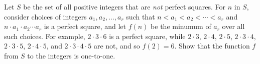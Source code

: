 Let $S$ be the set of all positive integers that are \emph{not} perfect squares. For $n$ in $S$, consider choices of integers
$a_1, a_2, \dots, a_r$ such that $n < a_1<  a_2 < \cdots < a_r$
and $n \cdot a_1 \cdot a_2 \cdots a_r$ is a perfect square, and
let $f(n)$ be the minumum of $a_r$ over all such choices. For example,
$2 \cdot 3 \cdot 6$ is a perfect square, while $2 \cdot 3$, $2 \cdot 4$, 
$2 \cdot 5$, $2 \cdot 3 \cdot 4$, $2 \cdot 3 \cdot 5$, $2 \cdot 4 \cdot 5$, and $2 \cdot 3 \cdot 4 \cdot 5$ are not, and so $f(2) = 6$.
Show that the function $f$ from $S$ to the integers is one-to-one.
